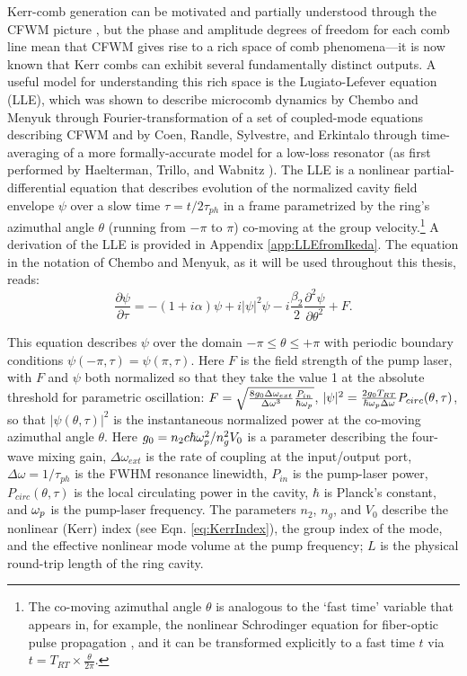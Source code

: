 Kerr-comb generation can be motivated and partially understood through the CFWM picture \cite{Herr2012}, but the phase and amplitude degrees of freedom for each comb line mean that CFWM gives rise to a rich space of comb phenomena---it is now known that Kerr combs can exhibit several fundamentally distinct outputs.  A useful model for understanding this rich space is the Lugiato-Lefever equation (LLE), which was shown to describe microcomb dynamics by Chembo and Menyuk \cite{Chembo2013} through Fourier-transformation of a set of coupled-mode equations describing CFWM and by Coen, Randle, Sylvestre, and Erkintalo \cite{Coen2013a} through time-averaging of a more formally-accurate model for a low-loss resonator (as first performed by Haelterman, Trillo, and Wabnitz \cite{Haelterman1992a}).  The LLE is a nonlinear partial-differential equation that describes evolution of the normalized cavity field envelope $\psi$ over a slow time $\tau=t/2\tau_{ph}$ in a frame parametrized by the ring's azimuthal angle $\theta$ (running from $-\pi$ to $\pi$) co-moving at the group velocity.\footnote{The co-moving azimuthal angle $\theta$ is analogous to the `fast time' variable that appears in, for example, the nonlinear Schrodinger equation for fiber-optic pulse propagation \cite{Agrawal2007}, and it can be transformed explicitly to a fast time $t$ via $t=T_{RT}\times\frac{\theta}{2\pi}$.} A derivation of the LLE is provided in Appendix \ref{app:LLEfromIkeda}. The equation in the notation of Chembo and Menyuk, as it will be used throughout this thesis, reads:
\begin{equation}
\frac{\partial \psi}{\partial \tau}=-(1+i \alpha) \psi + i|\psi|^2 \psi -i \frac{\beta_2}{2} \frac{\partial^2 \psi}{\partial \theta^2} +F. \label{eq:LLE}
\end{equation}

This equation describes $\psi$ over the domain $-\pi\leq\theta\leq+\pi$ with periodic boundary conditions $\psi(-\pi,\tau)=\psi(\pi,\tau)$. Here $F$ is the field strength of the pump laser, with $F$ and $\psi$ both normalized so that they  take the value 1 at the absolute threshold for parametric oscillation: $F=\sqrt{\frac{8 g_0\Delta\omega_{ext}}{\Delta\omega^3}\frac{P_{in}}{\hbar \omega_{p}}}$, $|\psi|^2=\frac{2g_0T_{RT}}{\hbar\omega_{p}\Delta\omega}P_{circ}(\theta,\tau)$, so that $|\psi(\theta,\tau)|^2$ is the instantaneous normalized power at the co-moving azimuthal angle $\theta$. Here $g_0=n_2 c \hbar \omega_{p}^2/n_g^2 V_0$ is a parameter describing the four-wave mixing gain, $\Delta\omega_{ext}$ is the rate of coupling at the input/output port, $\Delta\omega=1/\tau_{ph}$ is the FWHM resonance linewidth, $P_{in}$ is the pump-laser power, $P_{circ}(\theta,\tau)$ is the local circulating power in the cavity, $\hbar$ is Planck's constant, and $\omega_{p}$ is the pump-laser frequency. The parameters $n_2$, $n_g$, and $V_0$ describe the nonlinear (Kerr) index (see Eqn. \ref{eq:KerrIndex}), the group index of the mode, and the effective nonlinear mode volume at the pump frequency; $L$ is the physical round-trip length of the ring cavity. 

